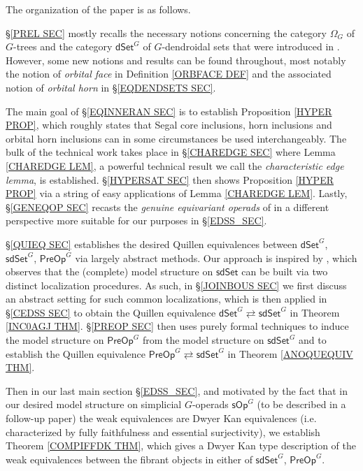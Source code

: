 \documentclass[a4paper,10pt
,draft
]{article}%
\begin{document}
\vskip 10pt

The organization of the paper is as follows.

\S \ref{PREL SEC} mostly recalls the necessary notions concerning the category $\Omega_G$ of $G$-trees and the category $\mathsf{dSet}^G$ of $G$-dendroidal sets 
that were introduced in \cite{Per17}.
However, some new notions and results can be found throughout, most notably the notion of \textit{orbital face} in Definition \ref{ORBFACE DEF}
and the associated notion of \textit{orbital horn} in 
\S \ref{EQDENDSETS SEC}.

The main goal of \S \ref{EQINNERAN SEC} is to establish
Proposition \ref{HYPER PROP},
which roughly states that Segal core inclusions, horn inclusions and orbital horn inclusions can in some circumstances be used interchangeably.
The bulk of the technical work takes place in 
\S \ref{CHAREDGE SEC} where Lemma \ref{CHAREDGE LEM},
a powerful technical result we call the
\textit{characteristic edge lemma}, is established.
\S \ref{HYPERSAT SEC} then shows Proposition \ref{HYPER PROP} via a string of easy applications of 
Lemma \ref{CHAREDGE LEM}.
Lastly, \S \ref{GENEQOP SEC} recasts the \textit{genuine equivariant operads} of \cite{BP17} in a different perspective more suitable for our purposes in \S \ref{EDSS_SEC}.

\S \ref{QUIEQ SEC} establishes the desired Quillen equivalences between 
$\mathsf{dSet}^G$, $\mathsf{sdSet}^G$, $\mathsf{PreOp}^G$
via largely abstract methods.
Our approach is inspired by 
\cite[Thm. 6.6]{CM13a}, which observes that the (complete) model structure on $\mathsf{sdSet}$ can be built via two distinct localization procedures.
As such, in \S \ref{JOINBOUS SEC} we first discuss an abstract setting for such common localizations, 
which is then applied in \S \ref{CEDSS SEC} to obtain the Quillen equivalence
$\mathsf{dSet}^G \rightleftarrows \mathsf{sdSet}^G$
in Theorem \ref{INC0AGJ THM}.
\S \ref{PREOP SEC} then uses purely formal techniques to induce the model structure on
$\mathsf{PreOp}^G$ from the model structure on
$\mathsf{sdSet}^G$
and to establish the Quillen equivalence
$\mathsf{PreOp}^G \rightleftarrows \mathsf{sdSet}^G$
in Theorem \ref{ANOQUEQUIV THM}.

Then in our last main section \S \ref{EDSS_SEC},
and motivated by the fact that in our desired model structure on simplicial $G$-operads $\mathsf{sOp}^G$
(to be described in a follow-up paper)
the weak equivalences are Dwyer Kan equivalences
(i.e. characterized by fully faithfulness and essential surjectivity), 
we establish Theorem \ref{COMPIFFDK THM}, which gives a Dwyer Kan type description of the weak equivalences 
between the fibrant objects in either of $\mathsf{sdSet}^G$, $\mathsf{PreOp}^G$.
\end{document}
